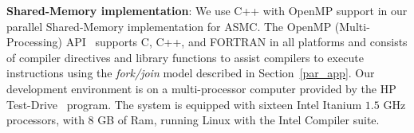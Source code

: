 \documentclass[11pt]{article}
\begin{document}



\textbf{Shared-Memory implementation}: We use C++ with OpenMP support in our parallel Shared-Memory implementation for ASMC. The OpenMP (Multi-Processing) API~\cite{OpenMP} supports C, C++, and FORTRAN in all platforms and consists of compiler directives and library functions to assist compilers to execute instructions using the \textit{fork/join} model described in Section~\ref{par_app}.  Our development environment is on a multi-processor computer provided by the HP Test-Drive~\cite{HP_Testdrive} program. The system is equipped with sixteen Intel Itanium $1.5$ GHz processors, with $8$ GB of Ram, running Linux with the Intel Compiler suite. 
\end{document}
